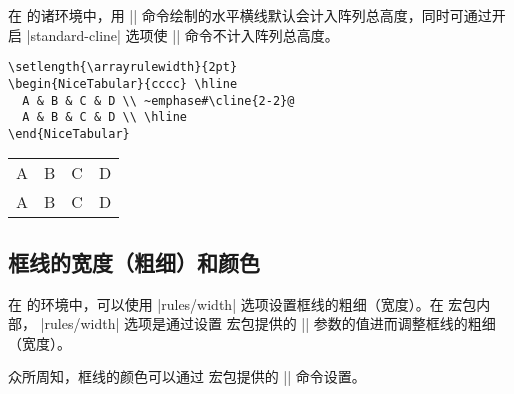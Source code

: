 \documentclass[dvipsnames]{article}%
\begin{document}
\medskip
在  的诸环境中，用 |\cline| 命令绘制的水平横线默认会计入阵列总高度，同时可通过开启 |standard-cline| 选项使 |\cline| 命令不计入阵列总高度。

\medskip
\begin{BVerbatim}[baseline=c,boxwidth=10cm]
\setlength{\arrayrulewidth}{2pt}
\begin{NiceTabular}{cccc} \hline
  A & B & C & D \\ ~emphase#\cline{2-2}@
  A & B & C & D \\ \hline
\end{NiceTabular}
\end{BVerbatim}
\begin{scope}
\setlength{\arrayrulewidth}{2pt}
\begin{NiceTabular}[c]{cccc}
\hline
A&B&C&D \\
A&B&C&D \\
\hline
\end{NiceTabular}
\end{scope}


\subsection{框线的宽度（粗细）和颜色}
\label{zm:RulesWidthColor}

在  的环境中，可以使用 |rules/width| 选项设置框线的粗细（宽度）。在  宏包内部， |rules/width| 选项是通过设置  宏包提供的 |\arrayrulewidth| 参数的值进而调整框线的粗细（宽度）。

众所周知，框线的颜色可以通过  宏包提供的 |\arrayrulecolor| 命令设置。

\end{document}
